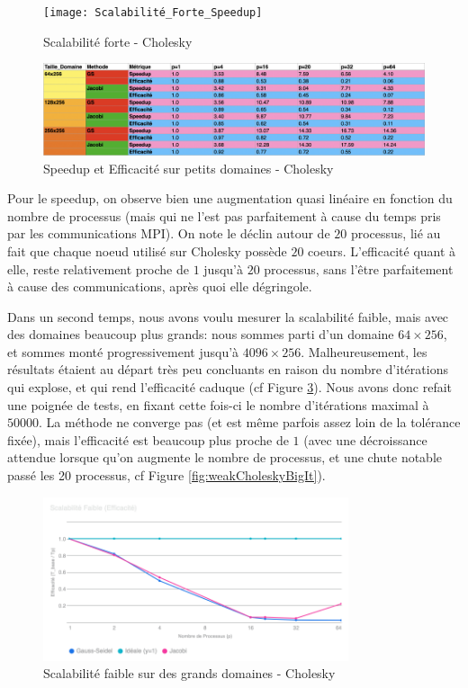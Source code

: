 \documentclass{article}
\begin{document}
\begin{figure}[H]
    \centering
    \texttt{[image: Scalabilité\_Forte\_Speedup]}
    \caption{Scalabilité forte - Cholesky}
    \label{fig:strongCholeskySmol}
\end{figure}

\begin{figure}[H]
    \centering
    \includegraphics[width=\textwidth]{choleskySmol.png}
    \caption{Speedup et Efficacité sur petits domaines - Cholesky}
    \label{fig:weakCholeskySmol}
\end{figure}

Pour le speedup, on observe bien une augmentation quasi linéaire en fonction du nombre de processus (mais qui ne l'est pas parfaitement à cause du temps pris par les communications MPI). On note le déclin autour de $20$ processus, lié au fait que chaque noeud utilisé sur Cholesky possède $20$ coeurs. L'efficacité quant à elle, reste relativement proche de $1$ jusqu'à $20$ processus, sans l'être parfaitement à cause des communications, après quoi elle dégringole.

Dans un second temps, nous avons voulu mesurer la scalabilité faible, mais avec des domaines beaucoup plus grands: nous sommes parti d'un domaine $64\times 256$, et sommes monté progressivement jusqu'à $4096\times 256$. Malheureusement, les résultats étaient au départ très peu concluants en raison du nombre d'itérations qui explose, et qui rend l'efficacité caduque (cf Figure \ref{fig:weakCholeskyBigDom}). Nous avons donc refait une poignée de tests, en fixant cette fois-ci le nombre d'itérations maximal à $50000$. La méthode ne converge pas (et est même parfois assez loin de la tolérance fixée), mais l'efficacité est beaucoup plus proche de $1$ (avec une décroissance attendue lorsque qu'on augmente le nombre de processus, et une chute notable passé les 20 processus, cf Figure \ref{fig:weakCholeskyBigIt}).

\begin{figure}[H]
    \centering
    \includegraphics[width=0.8\textwidth]{Scalabilité_Faible_Efficacité}
    \caption{Scalabilité faible sur des grands domaines - Cholesky}
    \label{fig:weakCholeskyBigDom}
\end{figure}
\end{document}
